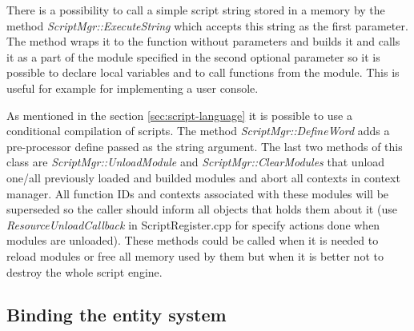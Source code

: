 
There is a possibility to call a simple script string stored in a memory by the method \emph{ScriptMgr::ExecuteString} which accepts this string as the first parameter. The method wraps it to the function without parameters and builds it and calls it as a part of the module specified in the second optional parameter so it is possible to declare local variables and to call functions from the module. This is useful for example for implementing a user console.

As mentioned in the section \ref{sec:script-language} it is possible to use a conditional compilation of scripts. The method \emph{ScriptMgr::DefineWord} adds a pre-processor define passed as the string argument. The last two methods of this class are \emph{ScriptMgr::UnloadModule} and \emph{ScriptMgr::ClearModules} that unload one/all previously loaded and builded modules and abort all contexts in context manager. All function IDs and contexts associated with these modules will be superseded so the caller should inform all objects that holds them about it (use \emph{ResourceUnloadCallback} in ScriptRegister.cpp for specify actions done when modules are unloaded). These methods could be called when it is needed to reload modules or free all memory used by them but when it is better not to destroy the whole script engine.

\subsection{Binding the entity system}
\label{sub:script-entity}


